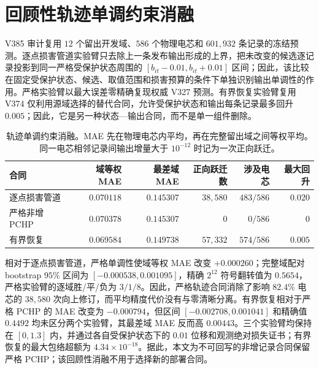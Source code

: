 \documentclass[UTF8,11pt]{ctexart}
\begin{document}
\section{回顾性轨迹单调约束消融}

V385 审计复用 $12$ 个留出开发域、$586$ 个物理电芯和 $601{,}932$ 条记录的冻结预测。逐点损害管道实验臂只去除上一条发布输出形成的上界，把未改变的候选逐记录投影到同一严格受保护状态周围的 $[b_{it}-0.01,b_{it}+0.01]$ 区间；因此，该比较在固定受保护状态、候选、取值范围和损害预算的条件下单独识别输出单调性的作用。严格实验臂以最大误差零精确复现权威 V327 预测。有界恢复实验臂复用 V374 仅利用源域选择的替代合同，允许受保护状态和输出每条记录最多回升 $0.005$；因此，它是另一种状态—输出合同，而不是单一组件删除。

\begin{table}[H]
\centering
\caption{轨迹单调约束消融。MAE 先在物理电芯内平均，再在完整留出域之间等权平均。同一电芯相邻记录间输出增量大于 $10^{-12}$ 时记为一次正向跃迁。}
\label{tab:monotonicity_ablation_zh}
\scriptsize
\begin{tabular}{lrrrrr}
\toprule
合同 & 域等权 MAE & 最差域 MAE & 正向跃迁数 & 涉及电芯 & 最大回升 \\
\midrule
逐点损害管道 & $0.070118$ & $0.145307$ & $38{,}580$ & $483/586$ & $0.020$ \\
严格非增 PCHP & $0.070378$ & $0.145307$ & $0$ & $0/586$ & $0$ \\
有界恢复 & $0.069584$ & $0.149738$ & $57{,}332$ & $574/586$ & $0.005$ \\
\bottomrule
\end{tabular}
\end{table}

相对于逐点损害管道，严格单调性使域等权 MAE 改变 $+0.000260$；完整域配对 bootstrap $95\%$ 区间为 $[-0.000538,0.001095]$，精确 $2^{12}$ 符号翻转值为 $0.5654$，严格实验臂的逐域胜/平/负为 $3/1/8$。因此，严格轨迹合同消除了影响 $82.4\%$ 电芯的 $38{,}580$ 次向上修订，而平均精度代价没有与零清晰分离。有界恢复相对于严格 PCHP 的 MAE 改变为 $-0.000794$，但区间 $[-0.002708,0.001041]$ 和精确值 $0.4492$ 均未区分两个实验臂，其最差域 MAE 反而高 $0.00443$。三个实验臂均保持在 $[0,1.3]$ 内，并通过各自受保护状态下的 $0.01$ 位移和观测绝对损失证书；有界恢复的最大包络超额为 $4.34\times10^{-18}$。据此，本文为不可回写的非增记录合同保留严格 PCHP；该回顾性消融不用于选择新的部署合同。
\end{document}
